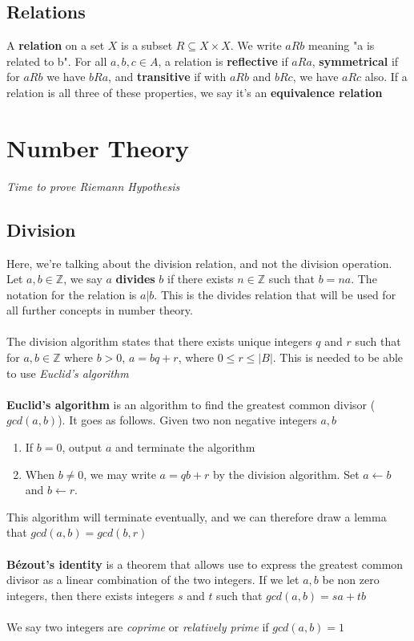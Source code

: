 \documentclass{article}
\begin{document}
\subsection{Relations}
A \textbf{relation} on a set $X$ is a subset $R \subseteq X\times X$. We write $aRb$ meaning "a is related to b". For all $a,b,c\in A$, a relation is \textbf{reflective} if $aRa$, \textbf{symmetrical} if for $aRb$ we have $bRa$, and \textbf{transitive} if with $aRb$ and $bRc$, we have $aRc$ also. If a relation is all three of these properties, we say it's an \textbf{equivalence relation}

\section{Number Theory}
\textit{Time to prove Riemann Hypothesis}
\subsection{Division}
Here, we're talking about the division relation, and not the division operation. Let $a,b \in \mathds{Z}$, we say $a$ \textbf{divides} $b$  if there exists $n\in \mathds{Z}$ such that $b = na$. The notation for the relation is $a|b$. This is the divides relation that will be used for all further concepts in number theory.
\\\\
The division algorithm states that there exists unique integers $q$ and $r$ such that for $a,b\in\mathds{Z}$ where $b>0$, $a=bq+r$, where $0\le r \le|B|$. This is needed to be able to use \textit{Euclid's algorithm}
\\\\
\textbf{Euclid's algorithm} is an algorithm to find the greatest common divisor ($gcd(a,b)$). It goes as follows. Given two non negative integers $a,b$
\begin{enumerate}
    \item If $b=0$, output $a$ and terminate the algorithm
    \item When $b\ne0$, we may write $a=qb+r$ by the division algorithm. Set $a\leftarrow b$ and $b\leftarrow r$.
\end{enumerate}
This algorithm will terminate eventually, and we can therefore draw a lemma that $gcd(a,b) = gcd(b,r)$
\\\\
\textbf{Bézout's identity} is a theorem that allows use to express the greatest common divisor as a linear combination of the two integers. If we let $a,b$ be non zero integers, then there exists integers $s$ and $t$ such that $gcd(a,b) = sa+tb$
\\\\
We say two integers are \textit{coprime} or \textit{relatively prime} if  $gcd(a,b) = 1$
\end{document}
